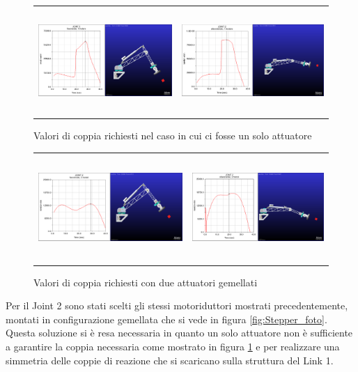 \documentclass[%
corpo=11pt,
twoside,
 stile=classica,
oldstyle,
greek,%
]{toptesi}
\begin{document}
		\begin{figure}[!ht]
			\centering
			\begin{tabular}{ll}
				\includegraphics[height=4cm,keepaspectratio]{Plots/SPALLA/1motore/JOINT2_conservativo.png}
				&
				\includegraphics[height=4cm,keepaspectratio]{Plots/SPALLA/1motore/JOINT2-torque.png}
			\end{tabular}
			\caption{Valori di coppia richiesti nel caso in cui ci fosse un solo attuatore}
			\label{fig:MBDJoint21motore}
		\end{figure}
		\begin{figure} [!ht]
			\centering
			\begin{tabular}{ll}
				\includegraphics[height=4cm,keepaspectratio]{Plots/SPALLA/2motori/JOINT22favorevole.png}
				&
				\includegraphics[height=4cm,keepaspectratio]{Plots/SPALLA/2motori/JOINT22sfavorevole.png}
			\end{tabular}
			\caption{Valori di coppia richiesti con due attuatori gemellati}
			\label{fig:MBDJoint22motore}
		\end{figure}
		Per il Joint 2 sono stati scelti gli stessi motoriduttori mostrati precedentemente, montati in configurazione gemellata che si vede in figura \ref{fig:Stepper_foto}. \\
		Questa soluzione si è resa necessaria in quanto un solo attuatore non è sufficiente a garantire la coppia necessaria come mostrato in figura \ref{fig:MBDJoint21motore} e per realizzare una simmetria delle coppie di reazione che si scaricano sulla struttura del Link 1. \\
		
\end{document}
